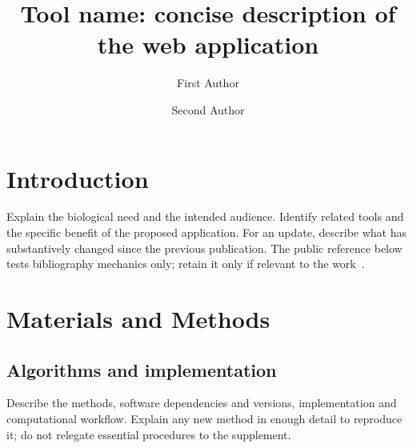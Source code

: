 \documentclass[unnumsec,webpdf,modern,large]{oup-authoring-template}
\begin{document}
\DOI{}
\copyrightyear{}
\pubyear{}

\title[Tool name and short title]{Tool name: concise description of the web application}
\author[1,$\ast$]{First Author}
\author[1,2]{Second Author}
\address[1]{, ,
  }
\address[2]{, ,
  }

\maketitle
\thispagestyle{plain}
\pagestyle{plain}

\section{Introduction}\label{sec:introduction}
Explain the biological need and the intended audience. Identify related
tools and the specific benefit of the proposed application. For an update,
describe what has substantively changed since the previous publication.
The public reference below tests bibliography mechanics only; retain it
only if relevant to the work~\cite{wilkinson2016fair}.

\section{Materials and Methods}\label{sec:methods}
\subsection{Algorithms and implementation}
Describe the methods, software dependencies and versions, implementation
and computational workflow. Explain any new method in enough detail to
reproduce it; do not relegate essential procedures to the supplement.
\end{document}
